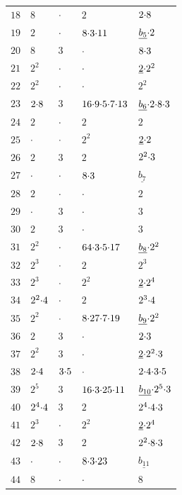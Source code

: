 \begin{longtable}{l|llll}
$18$ & $8$ & $\mathord{\cdot}$ & $2$ & $2\mathord{\cdot}8$ \\
$19$ & $2$ & $\mathord{\cdot}$ & $8\mathord{\cdot}3\mathord{\cdot}11$ & $\underline{b_5}\mathord{\cdot}2$\\
$20$ & $8$ & $3$ & $\mathord{\cdot}$ & $8\mathord{\cdot}3$\\
$21$ & $2^2$ & $\mathord{\cdot}$ & $\mathord{\cdot}$ & $\underline{2}\mathord{\cdot}2^2$ \\
$22$ & $2^2$ & $\mathord{\cdot}$ & $\mathord{\cdot}$ & $2^2$ \\
$23$ & $2\mathord{\cdot}8$ & $3$ & $16\mathord{\cdot}9\mathord{\cdot}5\mathord{\cdot}7\mathord{\cdot}13$ & $\underline{b_6}\mathord{\cdot}2\mathord{\cdot}8\mathord{\cdot}3$ \\
$24$ & $2$ & $\mathord{\cdot}$ & $2$ & $2$ \\
$25$ & $\mathord{\cdot}$ & $\mathord{\cdot}$ & $2^2$ & $\underline{2}\mathord{\cdot}2$ \\
$26$ & $2$ & $3$ & $2$ & $2^2\mathord{\cdot}3$ \\
$27$ & $\mathord{\cdot}$ & $\mathord{\cdot}$ & $8\mathord{\cdot}3$ & $\underline{b_7}$ \\
$28$ & $2$ & $\mathord{\cdot}$ & $\mathord{\cdot}$ & $2$ \\
$29$ & $\mathord{\cdot}$ & $3$ & $\mathord{\cdot}$ & $3$ \\
$30$ & $2$ & $3$ & $\mathord{\cdot}$ & $3$ \\
$31$ & $2^2$ & $\mathord{\cdot}$ & $64\mathord{\cdot}3\mathord{\cdot}5\mathord{\cdot}17$ & $\underline{b_8}\mathord{\cdot}2^2$ \\
$32$ & $2^3$ & $\mathord{\cdot}$ & $2$ & $2^3$ \\
$33$ & $2^3$ & $\mathord{\cdot}$ & $2^2$ & $\underline{2}\mathord{\cdot}2^4$ \\
$34$ & $2^2\mathord{\cdot}4$ & $\mathord{\cdot}$ & $2$ & $2^3\mathord{\cdot}4$ \\
$35$ & $2^2$ & $\mathord{\cdot}$ & $8\mathord{\cdot}27\mathord{\cdot}7\mathord{\cdot}19$ & $\underline{b_9}\mathord{\cdot}2^2$ \\
$36$ & $2$ & $3$ & $\mathord{\cdot}$ & $2\mathord{\cdot}3$ \\
$37$ & $2^2$ & $3$ & $\mathord{\cdot}$ & $\underline{2}\mathord{\cdot}2^2\mathord{\cdot}3$ \\
$38$ & $2\mathord{\cdot}4$ & $3\mathord{\cdot}5$ & $\mathord{\cdot}$ & $2\mathord{\cdot}4\mathord{\cdot}3\mathord{\cdot}5$ \\
$39$ & $2^5$ & $3$ & $16\mathord{\cdot}3\mathord{\cdot}25\mathord{\cdot}11$ & $\underline{b_{10}}\mathord{\cdot}2^5\mathord{\cdot}3$ \\
$40$ & $2^4\mathord{\cdot}4$ & $3$ & $2$ & $2^4\mathord{\cdot}4\mathord{\cdot}3$ \\
$41$ & $2^3$ & $\mathord{\cdot}$ & $2^2$ & $\underline{2}\mathord{\cdot}2^4$ \\
$42$ & $2\mathord{\cdot}8$ & $3$ & $2$  & $2^2\mathord{\cdot}8\mathord{\cdot}3$\\
$43$ & $\mathord{\cdot}$ & $\mathord{\cdot}$ & $8\mathord{\cdot}3\mathord{\cdot}23$ & $\underline{b_{11}}$ \\
$44$ & $8$ & $\mathord{\cdot}$ & $\mathord{\cdot}$ & $8$ \\

\end{longtable}
